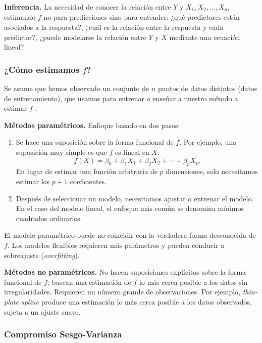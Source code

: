 \documentclass[12pt, a4paper]{article}
\begin{document}
\textbf{Inferencia.} La necesidad de conocer la relación entre $Y$ y
$X_1, X_2, \ldots, X_p$, estimando $f$ no para predicciones sino para
entender: ¿qué predictores están asociados a la respuesta?, ¿cuál
es la relación entre la respuesta y cada predictor?, ¿puede modelarse
la relación entre $Y$ y $X$ mediante una ecuación lineal?

\subsubsection{¿Cómo estimamos \texorpdfstring{$f$}{f}?}

Se asume que hemos observado un conjunto de $n$ puntos de datos
distintos (datos de entrenamiento), que usamos para entrenar o enseñar
a nuestro método a estimar $f$ \citep[Sec.~2.1.3]{islp2023}.

\textbf{Métodos paramétricos.} Enfoque basado en dos pasos:
\begin{enumerate}
  \item Se hace una suposición sobre la forma funcional de $f$.
    Por ejemplo, una suposición muy simple es que $f$ es lineal en $X$:
    \begin{equation}
      f(X) = \beta_0 + \beta_1 X_1 + \beta_2 X_2 + \cdots + \beta_p X_p.
    \end{equation}
    En lugar de estimar una función arbitraria de $p$ dimensiones,
    solo necesitamos estimar los $p+1$ coeficientes.
  \item Después de seleccionar un modelo, necesitamos ajustar o
    entrenar el modelo. En el caso del modelo lineal, el enfoque más
    común se denomina mínimos cuadrados ordinarios.
\end{enumerate}

El modelo paramétrico puede no coincidir con la verdadera forma
desconocida de $f$. Los modelos flexibles requieren más parámetros
y pueden conducir a sobreajuste (\textit{overfitting}).

\textbf{Métodos no paramétricos.} No hacen suposiciones explícitas
sobre la forma funcional de $f$; buscan una estimación de $f$ lo más
cerca posible a los datos sin irregularidades. Requieren un número
grande de observaciones. Por ejemplo, \textit{thin-plate spline}
produce una estimación lo más cerca posible a los datos observados,
sujeta a un ajuste suave.

\subsubsection{Compromiso Sesgo-Varianza}
\end{document}
